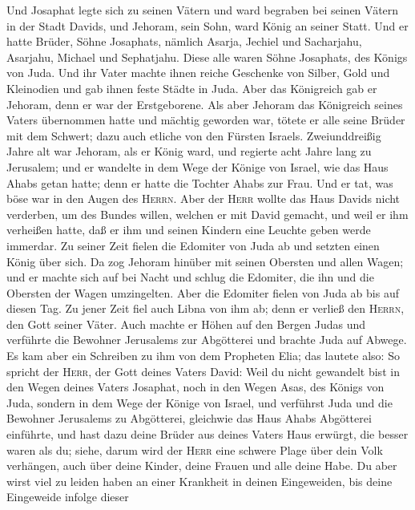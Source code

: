  Und Josaphat legte sich zu seinen Vätern und ward
begraben bei seinen Vätern in der Stadt Davids, und Jehoram, sein Sohn,
ward König an seiner Statt.  Und er hatte Brüder, Söhne
Josaphats, nämlich Asarja, Jechiel und Sacharjahu, Asarjahu, Michael und
Sephatjahu. Diese alle waren Söhne Josaphats, des Königs von Juda.
 Und ihr Vater machte ihnen reiche Geschenke von Silber,
Gold und Kleinodien und gab ihnen feste Städte in Juda. Aber das
Königreich gab er Jehoram, denn er war der Erstgeborene. 
Als aber Jehoram das Königreich seines Vaters übernommen hatte und
mächtig geworden war, tötete er alle seine Brüder mit dem Schwert; dazu
auch etliche von den Fürsten Israels.  Zweiunddreißig
Jahre alt war Jehoram, als er König ward, und regierte acht Jahre lang
zu Jerusalem;  und er wandelte in dem Wege der Könige von
Israel, wie das Haus Ahabs getan hatte; denn er hatte die Tochter Ahabs
zur Frau. Und er tat, was böse war in den Augen des \textsc{Herrn}.
 Aber der \textsc{Herr} wollte das Haus Davids nicht
verderben, um des Bundes willen, welchen er mit David gemacht, und weil
er ihm verheißen hatte, daß er ihm und seinen Kindern eine Leuchte geben
werde immerdar.  Zu seiner Zeit fielen die Edomiter von
Juda ab und setzten einen König über sich.  Da zog Jehoram
hinüber mit seinen Obersten und allen Wagen; und er machte sich auf bei
Nacht und schlug die Edomiter, die ihn und die Obersten der Wagen
umzingelten.  Aber die Edomiter fielen von Juda ab bis
auf diesen Tag. Zu jener Zeit fiel auch Libna von ihm ab; denn er
verließ den \textsc{Herrn}, den Gott seiner Väter.  Auch
machte er Höhen auf den Bergen Judas und verführte die Bewohner
Jerusalems zur Abgötterei und brachte Juda auf Abwege. 
Es kam aber ein Schreiben zu ihm von dem Propheten Elia; das lautete
also: So spricht der \textsc{Herr}, der Gott deines Vaters David: Weil
du nicht gewandelt bist in den Wegen deines Vaters Josaphat, noch in den
Wegen Asas, des Königs von Juda,  sondern in dem Wege der
Könige von Israel, und verführst Juda und die Bewohner Jerusalems zu
Abgötterei, gleichwie das Haus Ahabs Abgötterei einführte, und hast dazu
deine Brüder aus deines Vaters Haus erwürgt, die besser waren als du;
 siehe, darum wird der \textsc{Herr} eine schwere Plage
über dein Volk verhängen, auch über deine Kinder, deine Frauen und alle
deine Habe.  Du aber wirst viel zu leiden haben an einer
Krankheit in deinen Eingeweiden, bis deine Eingeweide infolge dieser
